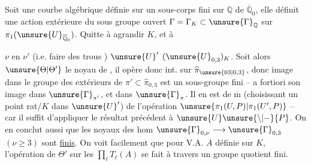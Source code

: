 Soit une courbe algébrique  définie sur un sous-corps  fini sur $\mathbb Q$ de $\overline{\mathbb Q}_0$,  elle définit une action extérieure du sous groupe ouvert $\Gamma=\Gamma_K\subset\unsure{\Gamma}_{\mathbb Q}$ sur $\pi_1(\unsure{U}_{\overline{\mathbb Q}_0})$.  Quitte à agrandir $K$,  et à 


$\nu$ en $\nu'$ (i.e. faire des trous )  $\unsure{U}'$   $(\unsure{U}_{0,3})_K$.
 
Soit alors $\unsure{\Theta|\Theta'}$ le noyau de
,
il opère donc   int. sur $\widehat{\pi}_{\unsure{03|0,3}}$, donc image  dans le groupe des  extérieurs de $\pi'\subset\widehat{\pi}_{0,3}$ est un sous-groupe fini -- a fortiori son image dans $\unsure{\Gamma}_{\pi'}$, et dans  $\unsure{\Gamma}_{\pi}$. Il en est de $\overline{\mathrm m}$ (choisissant un point  rat/$K$ dans $\unsure{U}'$) de l'opération   $\unsure{\pi_1(U,P)|\pi_1(U',P)}$ -- car il suffit d'appliquer le résultat précédent à $\unsure{U}\unsure{\backslash|-}\{P\}$. On en conclut aussi que  les noyaux des hom $\unsure{\Gamma}_{0,\nu}\longrightarrow\unsure{\Gamma}_{0,3}$ $(\nu\geq3)$ sont \uline{finis}. On voit facilement que pour  V.A. $A$ définie sur $K$, l'opération de $\Theta'$ sur les $\prod_\ell T_\ell(A)$ se fait à travers un groupe quotient fini.

